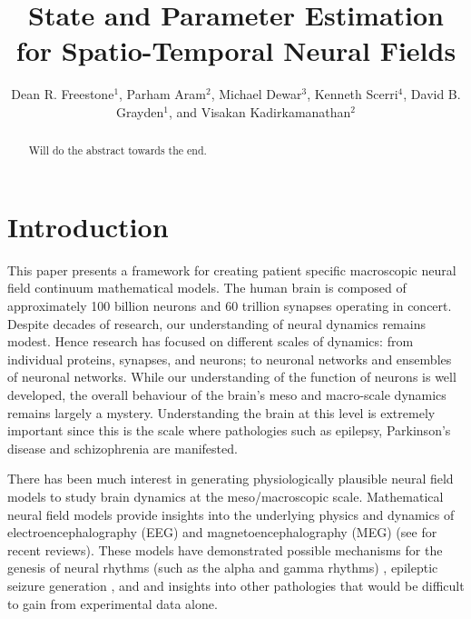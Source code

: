 \documentclass[12pt]{iopart}		%
\begin{document}
\title[State and Parameter Estimation for Spatio-Temporal Neural Fields]{State and Parameter Estimation for Spatio-Temporal Neural Fields}

\author{Dean R. Freestone$^1$, Parham Aram$^2$, Michael Dewar$^3$, Kenneth Scerri$^4$, David B. Grayden$^1$, and Visakan Kadirkamanathan$^2$}

\address{$^1$ Department
of Electrical and Electronic Engineering, University of Melbourne, Melbourne,
Vic, 3010 Australia}
\address{$^2$ Department
of Automatic Control and Systems Engineering, University of Sheffield, Mappin Street, Sheffield,
S1 3JD, UK}
\address{$^3$ Mike's}
\address{$^4$ Ken's}
\begin{abstract}
Will do the abstract towards the end.
\end{abstract}

\maketitle

\section{Introduction}
This paper presents a framework for creating patient specific macroscopic neural field continuum mathematical models. The human brain is composed of approximately 100 billion neurons and 60 trillion synapses operating in concert. Despite decades of research, our understanding of neural dynamics remains modest. Hence research has focused on different scales of dynamics: from individual proteins, synapses, and neurons; to neuronal networks and ensembles of neuronal networks. While our understanding of the function of neurons is well developed, the overall behaviour of the brain's meso and macro-scale dynamics remains largely a mystery.  Understanding the brain at this level is extremely important since this is the scale where pathologies such as epilepsy, Parkinson's disease and schizophrenia are manifested.

There has been much interest in generating physiologically plausible neural field models to study brain dynamics at the meso/macroscopic scale. Mathematical neural field  models provide insights into the underlying physics and dynamics of electroencephalography (EEG) and magnetoencephalography (MEG) (see \cite{Deco2008} \cite{David2003} for recent reviews). These models have demonstrated possible mechanisms for the genesis of neural rhythms (such as the alpha and gamma rhythms) \cite{Liley1999} \cite{RENNIE2000}, epileptic seizure generation \cite{DaSilva2003}, \cite{Suffczynski2004} and \cite{Wendling2005} and insights into other pathologies \cite{Moran2008} \cite{Schiff2009} that would be difficult to gain from experimental data alone. 
\end{document}
